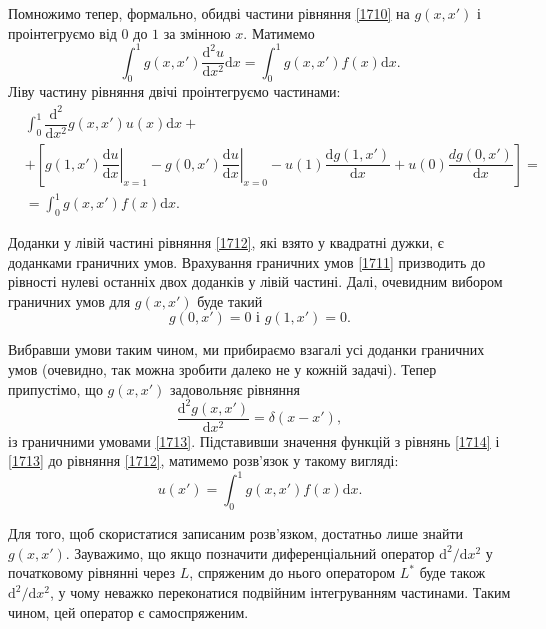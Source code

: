 \documentclass[14pt,twoside]{extreport}
\theoremstyle{mystyle}
\numberwithin{equation}{chapter}
\begin{document}
Помножимо тепер, формально, обидві частини рівняння \eqref{1710} на $g(x, x')$ і проінтегруємо від $0$ до $1$ за змінною $x$. Матимемо
$$
\int_{0}^{1}g(x, x')\frac{\mathrm{d}^{2}u}{\mathrm{d}x^{2}}\mathrm{d}x=\int_{0}^{1}g(x, x')f(x)\mathrm{d}x.
$$
Ліву частину рівняння двічі проінтегруємо частинами:
\begin{equation}\label{1712}
\begin{array}{ll}
&\displaystyle\int_{0}^{1}\dfrac{\mathrm{d}^{2}}{\mathrm{d}x^{2}}g(x, x')u(x)\mathrm{d}x +\\
&+\left[g(1, x')\left.\dfrac{\mathrm{d}u}{\mathrm{d}x}\right|_{x=1}-g(0,x')\left.\dfrac{\mathrm{d}u}{\mathrm{d}x}\right|_{x=0}-u(1)\dfrac{\mathrm{d}g(1,x')}{\mathrm{d}x}+u(0)\dfrac{dg(0,x')}{\mathrm{d}x}\right]=\\
&=\displaystyle\int_{0}^{1}g(x, x')f(x)\mathrm{d}x.
\end{array}
\end{equation}

Доданки у лівій частині рівняння \eqref{1712}, які взято у квадратні дужки, є доданками граничних умов. Врахування граничних умов \eqref{1711} призводить до рівності нулеві останніх двох доданків у лівій частині. Далі, очевидним вибором граничних умов для $g(x, x')$ буде такий
\begin{equation}\label{1713}
g(0,x')=0 \textrm{ і }g(1,x')=0.
\end{equation}

Вибравши умови таким чином, ми прибираємо взагалі усі доданки граничних умов (очевидно, так можна зробити далеко не у кожній задачі). Тепер припустімо, що $g(x, x')$ задовольняє рівняння
\begin{equation}\label{1714}
\frac{\mathrm{d}^{2}g(x,x')}{\mathrm{d}x^{2}}=\delta(x-x'),
\end{equation}
із граничними умовами \eqref{1713}. Підставивши значення функцій з рівнянь \eqref{1714} і \eqref{1713} до рівняння \eqref{1712}, матимемо розв'язок у такому вигляді:
\begin{equation}\label{1715}
u(x')=\int_{0}^{1}g(x, x')f(x)\mathrm{d}x.
\end{equation}

Для того, щоб скористатися записаним розв'язком, достатньо лише знайти $g(x, x')$. Зауважимо, що якщо позначити диференціальний оператор $\mathrm{d}^{2}/\mathrm{d}x^{2}$ у початковому рівнянні через $L$, спряженим до нього оператором $L^{*}$ буде також $\mathrm{d}^{2}/\mathrm{d}x^{2}$, у чому неважко переконатися подвійним інтегруванням частинами. Таким чином, цей оператор є самоспряженим.
\end{document}
